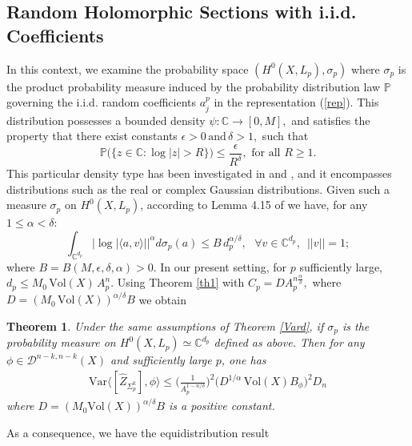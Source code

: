 \documentclass[11pt,leqno,oneside]{amsart}
\newtheorem{thm}{Theorem}[section]
\numberwithin{equation}{section}
\begin{document}
\subsection{Random Holomorphic Sections with i.i.d. Coefficients} In this context, we examine the probability space $(H^{0}(X,L_{p}), \sigma_{p})$
where $\sigma_{p}$ is the product probability measure induced by the probability distribution law $\mathbb{P}$ governing the i.i.d. random coefficients  $a_{j}^{p}$ in the representation (\ref{rep}). This distribution possesses a bounded density $\psi:\mathbb{C}\rightarrow [0, M],$ and satisfies  the property that there exist constants $\epsilon>0\,\text{and} \, \delta>1,$ such that
\begin{equation}
	\mathbb{P}\big(\{z\in \mathbb{C}: \log|z|>R\}\big)\leq \frac{\epsilon}{R^{\delta}}, \, \, \text{for all } R\geq 1.
\end{equation}
This particular density type has been investigated in \cite{Bay16} and \cite{BCM}, and it encompasses distributions such as the real or complex Gaussian distributions.
 Given such a measure $\sigma_{p}$ on $H^{0}(X, L_{p})$, according to  Lemma 4.15 of \cite{BCM} we have, for any $1\leq \alpha <\delta:$
 \begin{equation}\int_{\mathbb{C}^{d_{p}}}{|\log{|\langle a, v \rangle|}|}^{\alpha}d\sigma_{p}(a)\leq B\,d_{p}^{\alpha /\delta}, \,\,\,\,\forall v\in \mathbb{C}^{d_{p}},\,\,\,||v||=1;\end{equation}
where $B=B(M, \epsilon, \delta, \alpha)>0.$ In our present setting, for $p$ sufficiently large, $d_{p}\leq M_{0}\,\mathrm{Vol}(X)\,A_{p}^{n}.$ Using  Theorem \ref{th1} with $C_{p}=DA_{p}^{n\frac{\alpha}{\delta}},$ where $D=(M_{0}\,\mathrm{Vol}(X))^{\alpha/\delta} B$ we obtain
\begin{thm} Under the same assumptions of Theorem \ref{Vard}, if $\sigma_{p}$ is the probability measure on  $H^{0}(X, L_{p})\simeq \mathbb{C}^{d_{p}}$ defined as above. Then for any  $\phi\in \mathcal{D}^{n-k, n-k}(X)$ and sufficiently large $p$, one has \begin{align*}
		\mathrm{Var}\langle [\widehat{Z}_{\Sigma_{p}^{k}}], \phi \rangle   \leq \Big(\frac{1}{A_{p}^{1-n/\delta}}\Big)^{2} \big(D^{1/\alpha}\,\mathrm{Vol}(X)B_{\phi}\big)^{2} D_n
	\end{align*}where  $D=(M_{0}\mathrm{Vol}(X))^{\alpha/\delta}B$ is a positive constant.   \end{thm}
As a consequence,  we have the equidistribution result
\end{document}
